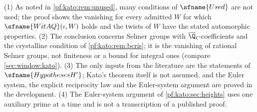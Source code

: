 \begin{remark}\label{pf:kato:rem:final}
(1) As noted in \cref{pf:kato:rem:unused}, many conditions of $\sfname{Used}$ are not used; the proof shows the vanishing for every
admitted $W$ for which $\sfname{WitAQ}(\iota,W)$ holds and the twists of $W$ have the stated automorphic properties. (2) The
conclusion concerns Selmer groups with $\katoQlb$-coefficients and the crystalline condition of \cref{pf:kato:rem:bcris}; it is
the vanishing of rational Selmer groups, not finiteness or a bound for integral ones (compare \cref{sec:window:kato}). (3) The
only inputs from the literature are the statements of $\sfname{HypothesesH'}$; Kato's theorem itself is not assumed, and the
Euler system, the explicit reciprocity law and the Euler-system argument are proved in the development. (4) The Euler-system
argument of \cref{pf:kato:sec:heights} uses one auxiliary prime at a time and is not a transcription of a published proof.
\end{remark}
